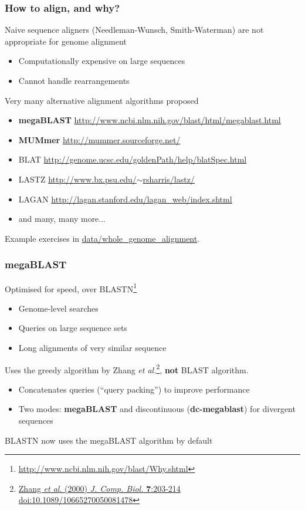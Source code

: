 \begin{frame}
  \frametitle{How to align, and why?}
  Naive sequence aligners (Needleman-Wunsch, Smith-Waterman) are not appropriate for genome alignment
  \begin{itemize}
    \item Computationally expensive on large sequences
    \item Cannot handle rearrangements
  \end{itemize}
  Very many alternative alignment algorithms proposed
  \begin{itemize}
    \item \textbf{megaBLAST} {\tiny\href{http://www.ncbi.nlm.nih.gov/blast/html/megablast.html}{http://www.ncbi.nlm.nih.gov/blast/html/megablast.html}}
    \item \textbf{MUMmer} {\tiny\href{http://mummer.sourceforge.net/}{http://mummer.sourceforge.net/}}
    \item BLAT {\tiny\href{http://genome.ucsc.edu/goldenPath/help/blatSpec.html}{http://genome.ucsc.edu/goldenPath/help/blatSpec.html}}
    \item LASTZ {\tiny\href{http://www.bx.psu.edu/~rsharris/lastz/}{http://www.bx.psu.edu/$\sim$rsharris/lastz/}}
    \item LAGAN {\tiny\href{http://lagan.stanford.edu/lagan_web/index.shtml}{http://lagan.stanford.edu/lagan\_web/index.shtml}}
    \item and many, many more$\ldots$        
  \end{itemize}
  Example exercises in \url{data/whole_genome_alignment}.
\end{frame}

\begin{frame}
  \frametitle{megaBLAST}
  Optimised for speed, over BLASTN\footnote{\tiny{\href{http://www.ncbi.nlm.nih.gov/blast/Why.shtml}{http://www.ncbi.nlm.nih.gov/blast/Why.shtml}}}
  \begin{itemize}
    \item Genome-level searches
    \item Queries on large sequence sets
    \item Long alignments of very similar sequence
  \end{itemize}
  Uses the greedy algorithm by Zhang \textit{et al.}\footnote{\tiny{\href{http://dx.doi.org/10.1089/10665270050081478}{Zhang \textit{et al}. (2000) \textit{J. Comp. Biol.} \textbf{7}:203-214 doi:10.1089/10665270050081478}}}, \textbf{not} BLAST algorithm.
  \begin{itemize}
    \item Concatenates queries (``query packing'') to improve performance
    \item Two modes: \textbf{megaBLAST} and discontinuous (\textbf{dc-megablast}) for divergent sequences
  \end{itemize}
  BLASTN now uses the megaBLAST algorithm by default
\end{frame}

